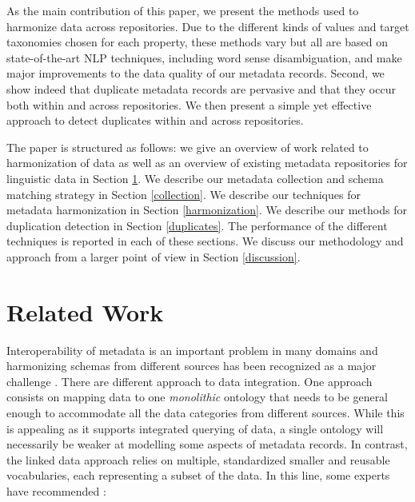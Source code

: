 \documentclass[11pt]{article}
\begin{document}

As the main contribution of this paper, we present the methods used to harmonize
data across repositories. Due to the different kinds of values and target
taxonomies chosen for each property, these methods vary but all are based on
state-of-the-art NLP techniques, including word sense disambiguation, and make
major improvements to the data quality of our metadata records.
Second, we show indeed that duplicate metadata records are pervasive and that they occur both within and across repositories. We then present a simple yet effective approach to detect duplicates within and across repositories. 

The paper is structured as follows: we give an overview of work related to harmonization of data as well as an overview of existing metadata repositories for linguistic data in Section \ref{rel_work}. We describe our metadata collection and schema matching strategy in Section \ref{collection}. We describe our techniques for metadata harmonization in Section \ref{harmonization}. We describe our methods for duplication detection in Section \ref{duplicates}. The performance of the different techniques is reported in each of these sections. We discuss our methodology and approach from a larger point of view in Section \ref{discussion}. 


\section{Related Work}

\label{rel_work}

Interoperability of metadata is an important problem in many domains and harmonizing schemas from different sources has been recognized as a major challenge 
\cite{nilsson2010interoperability,khoo2010merging,nogueras2004metadata}. 
There are different approach to data integration. One approach consists on
mapping data to one \emph{monolithic} ontology that needs to be general enough
to accommodate all the data categories from different sources. While this is 
appealing as it supports integrated querying of data, a
single ontology will necessarily be weaker at modelling some aspects of metadata
records. In contrast, the linked data approach relies on
multiple, standardized smaller and reusable vocabularies, each representing a 
subset of the data.  In this line, some experts have recommended \cite{brooks2006towards}:
\end{document}
